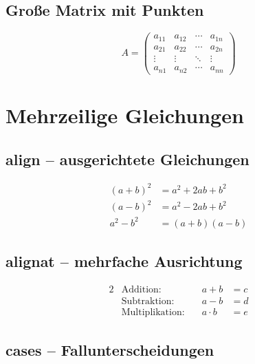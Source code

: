 \section{Große Matrix mit Punkten}

\[
    A = \begin{pmatrix}
        a_{11} & a_{12} & \cdots & a_{1n} \\
        a_{21} & a_{22} & \cdots & a_{2n} \\
        \vdots & \vdots & \ddots & \vdots \\
        a_{n1} & a_{n2} & \cdots & a_{nn}
    \end{pmatrix}
\]

\chapter{Mehrzeilige Gleichungen}
\label{sec:mehrzeilig}

\section{align -- ausgerichtete Gleichungen}

\begin{align}
    (a + b)^2 &= a^2 + 2ab + b^2 \label{eq:binom1} \\
    (a - b)^2 &= a^2 - 2ab + b^2 \label{eq:binom2} \\
    a^2 - b^2 &= (a+b)(a-b) \label{eq:binom3}
\end{align}

\section{alignat -- mehrfache Ausrichtung}

\begin{alignat*}{2}
    &\text{Addition:} &\quad a + b &= c \\
    &\text{Subtraktion:} &\quad a - b &= d \\
    &\text{Multiplikation:} &\quad a \cdot b &= e
\end{alignat*}

\section{cases -- Fallunterscheidungen}

